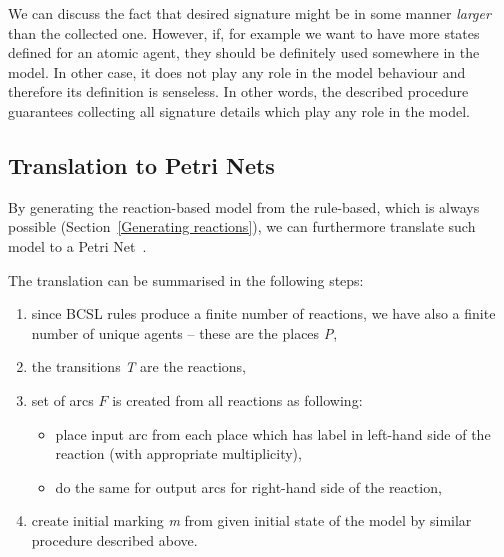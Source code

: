 \documentclass[12pt, twoside]{fithesis2} %
\newenvironment{proof}{\noindent\emph{Proof:~ }\nopagebreak \begin{itshape}}{\end{itshape}\bigskip}
\newcommand*{\QEDA}{\hfill\ensuremath{\blacksquare}}%
\begin{document}
We can discuss the fact that desired signature might be in some manner \emph{larger} than the collected one. However, if, for example we want to have more states defined for an atomic agent, they should be definitely used somewhere in the model. In other case, it does not play any role in the model behaviour and therefore its definition is senseless. In other words, the described procedure guarantees collecting all signature details which play any role in the model.


\subsection{Translation to Petri Nets}

By generating the reaction-based model from the rule-based, which is always possible (Section~\ref{Generating reactions}), we can furthermore translate such model to a Petri Net~\cite{petri}.

The translation can be summarised in the following steps: 

\begin{enumerate}
\item since BCSL rules produce a finite number of reactions, we have also a finite number of unique agents -- these are the places \emph{P},
\item the transitions \emph{T} are the reactions,
\item set of arcs $F$ is created from all reactions as following:
\begin{itemize}
  \item place input arc from each place which has label in left-hand side of the reaction (with appropriate multiplicity),
  \item do the same for output arcs for right-hand side of the reaction,
\end{itemize}
\item create initial marking \emph{m} from given initial state of the model by similar procedure described above.
\end{enumerate}
\end{document}
